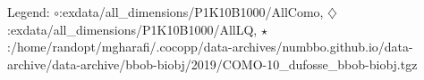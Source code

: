 Legend: {\color{NavyBlue}$\circ$}:exdata/all\_dimensions/P1K10B1000/AllComo, {\color{Magenta}$\diamondsuit$}:exdata/all\_dimensions/P1K10B1000/AllLQ, {\color{Orange}$\star$}:/home/randopt/mgharafi/.cocopp/data-archives/numbbo.github.io/data-archive/data-archive/bbob-biobj/2019/COMO-10\_dufosse\_bbob-biobj.tgz
